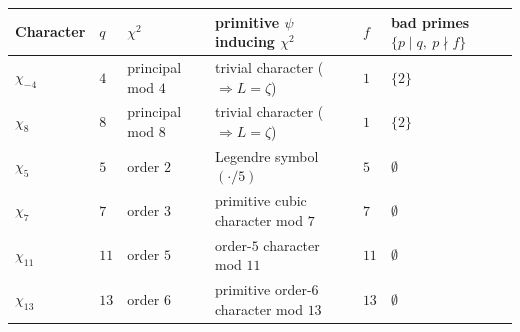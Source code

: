 {\def\LTcaptype{none} %
\begin{longtable}[]{@{}
  >{\raggedright\arraybackslash}p{}
  >{\raggedleft\arraybackslash}p{}
  >{\centering\arraybackslash}p{}
  >{\raggedright\arraybackslash}p{}
  >{\raggedleft\arraybackslash}p{}
  >{\raggedright\arraybackslash}p{}@{}}
\toprule\noalign{}
\begin{minipage}[b]{\linewidth}\raggedright
Character
\end{minipage} & \begin{minipage}[b]{\linewidth}\raggedleft
\(q\)
\end{minipage} & \begin{minipage}[b]{\linewidth}\centering
\(\chi^2\)
\end{minipage} & \begin{minipage}[b]{\linewidth}\raggedright
primitive \(\psi\) inducing \(\chi^2\)
\end{minipage} & \begin{minipage}[b]{\linewidth}\raggedleft
\(f\)
\end{minipage} & \begin{minipage}[b]{\linewidth}\raggedright
bad primes \(\{p \mid q,\ p \nmid f\}\)
\end{minipage} \\
\midrule\noalign{}
\endhead
\bottomrule\noalign{}
\endlastfoot
\(\chi_{-4}\) & \(4\) & principal mod \(4\) & trivial character (\(\Rightarrow L = \zeta\)) & \(1\) & \(\{2\}\) \\
\(\chi_8\) & \(8\) & principal mod \(8\) & trivial character (\(\Rightarrow L = \zeta\)) & \(1\) & \(\{2\}\) \\
\(\chi_5\) & \(5\) & order \(2\) & Legendre symbol \((\cdot/5)\) & \(5\) & \(\emptyset\) \\
\(\chi_7\) & \(7\) & order \(3\) & primitive cubic character mod \(7\) & \(7\) & \(\emptyset\) \\
\(\chi_{11}\) & \(11\) & order \(5\) & order-\(5\) character mod \(11\) & \(11\) & \(\emptyset\) \\
\(\chi_{13}\) & \(13\) & order \(6\) & primitive order-\(6\) character mod \(13\) & \(13\) & \(\emptyset\) \\
\end{longtable}
}

